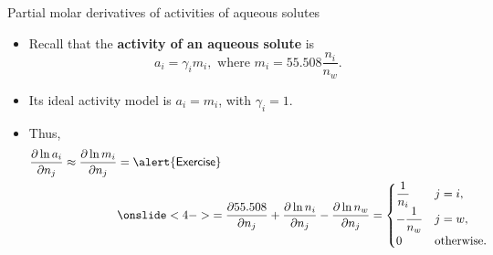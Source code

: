 \begin{frame}{Partial molar derivatives of activities of aqueous solutes}
\begin{itemize}
\item Recall that the {\bf activity of an aqueous solute} is
\[
a_{i}=\gamma_{i}m_{i},\text{ where }m_{i}=55.508\frac{n_{i}}{n_{w}}.
\]
\pause
\item Its ideal activity model is $a_{i}=m_{i}$, with $\gamma_{i}=1$.
\hiddenpause
\item Thus, 
%
\begin{alignat*}{2}
\frac{\partial\ln a_{i}}{\partial n_{j}}
\approx\frac{\partial\ln m_{i}}{\partial n_{j}} 
& = \mathsf{\alert{Exercise}} \\
& \onslide<4->{
	= \frac{\partial55.508}{\partial n_j} 
   + \frac{\partial\ln n_{i}}{\partial n_{j}}
   - \frac{\partial\ln n_{w}}{\partial n_{j}}
         = \begin{cases}
         	\dfrac{1}{n_{i}} & j=i,\\
         	-\dfrac{1}{n_{w}} & j=w,\\
         	0 & \text{otherwise}.
         \end{cases}}
\end{alignat*}
\end{itemize}
\end{frame}
%
%
%

